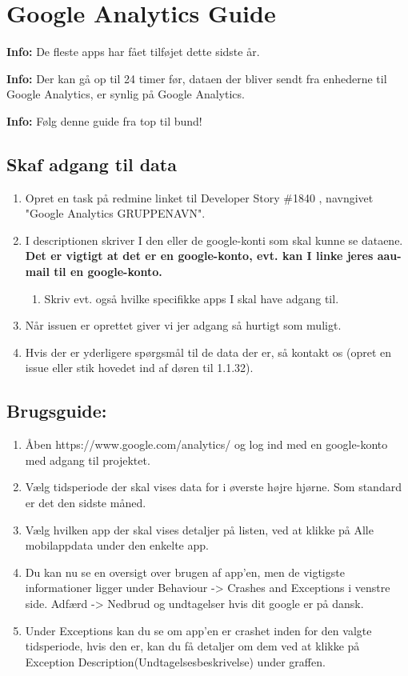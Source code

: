 \section{Google Analytics Guide}
\textbf{Info:} De fleste apps har fået tilføjet dette sidste år.

\textbf{Info:} Der kan gå op til 24 timer før, dataen der bliver sendt fra enhederne til Google Analytics, er synlig på Google Analytics.

\textbf{Info:} Følg denne guide fra top til bund!

\subsection{Skaf adgang til data}
\begin{enumerate}
	\item Opret en task på redmine linket til Developer Story \#1840 , navngivet "Google Analytics GRUPPENAVN".
	\item I descriptionen skriver I den eller de google-konti som skal kunne se dataene. \textbf{Det er vigtigt at det er en google-konto, evt. kan I linke jeres aau-mail til en google-konto.}
	\begin{enumerate}
		\item Skriv evt. også hvilke specifikke apps I skal have adgang til.
	\end{enumerate}
	\item Når issuen er oprettet giver vi jer adgang så hurtigt som muligt.
	\item Hvis der er yderligere spørgsmål til de data der er, så kontakt os (opret en issue eller stik hovedet ind af døren til 1.1.32).
\end{enumerate}

\subsection{Brugsguide:}
\begin{enumerate}
	\item Åben https://www.google.com/analytics/ og log ind med en google-konto med adgang til projektet.
	\item Vælg tidsperiode der skal vises data for i øverste højre hjørne. Som standard er det den sidste måned.
	\item Vælg hvilken app der skal vises detaljer på listen, ved at klikke på Alle mobilappdata under den enkelte app.
	\item Du kan nu se en oversigt over brugen af app'en, men de vigtigste informationer ligger under Behaviour -> Crashes and Exceptions i venstre side. Adfærd -> Nedbrud og undtagelser hvis dit google er på dansk.
	\item Under Exceptions kan du se om app'en er crashet inden for den valgte tidsperiode, hvis den er, kan du få detaljer om dem ved at klikke på Exception Description(Undtagelsesbeskrivelse) under graffen.
\end{enumerate}

